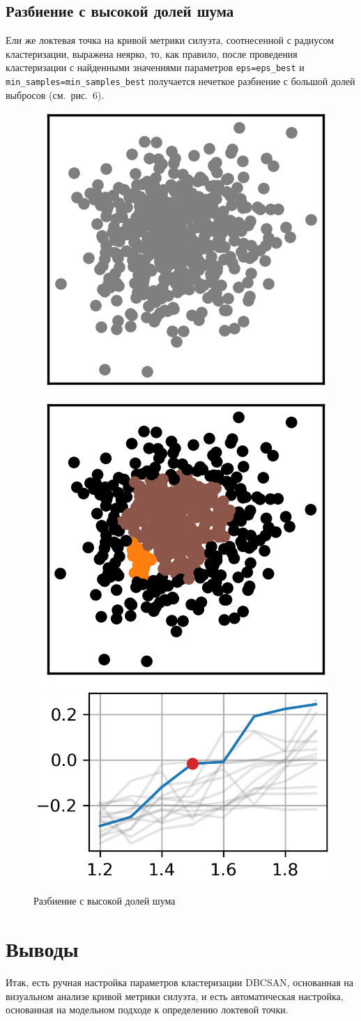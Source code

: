 \documentclass[a4paper,12pt]{article}
\begin{document}
\subsection{Разбиение с высокой долей шума}


Ели же локтевая точка на кривой метрики силуэта, соотнесенной с радиусом кластеризации, выражена неярко, то, как правило, после проведения кластеризации с найденными значениями параметров \texttt{eps=eps\_best} и\texttt{ min\_samples=min\_samples\_best} получается нечеткое разбиение с большой долей выбросов (см. рис. 6).

\begin{figure}[!h]
	\centering
	\includegraphics[width=0.25\linewidth]{pictures/Облако. Мазня}
	\hspace{0.05\linewidth}
	\includegraphics[width=0.25\linewidth]{pictures/Кластеры. Мазня}\\
	\includegraphics[width=0.42\linewidth]{pictures/Параметры. Мазня}
	\\
	\caption{Разбиение с высокой долей шума}
\end{figure}


\section{Выводы}


Итак, есть ручная настройка параметров кластеризации DBCSAN, основанная на визуальном анализе кривой метрики силуэта, и есть автоматическая настройка, основанная на модельном подходе к определению локтевой точки. 
\end{document}
